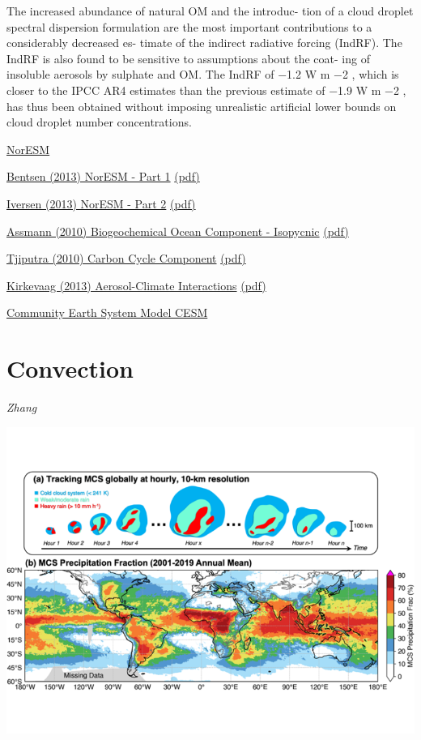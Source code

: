 \documentclass[
]{book}
\begin{document}
The increased abundance of natural OM and the introduc-
tion of a cloud droplet spectral dispersion formulation are the
most important contributions to a considerably decreased es-
timate of the indirect radiative forcing (IndRF). The IndRF
is also found to be sensitive to assumptions about the coat-
ing of insoluble aerosols by sulphate and OM. The IndRF of
−1.2 W m −2 , which is closer to the IPCC AR4 estimates than
the previous estimate of −1.9 W m −2 , has thus been obtained
without imposing unrealistic artificial lower bounds on cloud
droplet number concentrations.

\href{https://www.noresm.org/}{NorESM}

\href{https://gmd.copernicus.org/articles/6/687/2013/}{Bentsen (2013) NorESM - Part 1}
\href{pdf/Bentsen_2013_NorESM_1.pdf}{(pdf)}

\href{https://gmd.copernicus.org/articles/6/389/2013/}{Iversen (2013) NorESM - Part 2}
\href{pdf/Iversen_2013_NorESM_2.pdf}{(pdf)}

\href{https://gmd.copernicus.org/articles/3/143/2010/}{Assmann (2010) Biogeochemical Ocean Component - Isopycnic}
\href{pdf/Assmann_2010_Isopycnic_Ocean_Carbon_Cycle_Model.pdf}{(pdf)}

\href{https://gmd.copernicus.org/articles/3/123/2010/}{Tjiputra (2010) Carbon Cycle Component}
\href{pdf/Tjiputra_2010_Climate_Cycle_Feedbacks.pdf}{(pdf)}

\href{https://gmd.copernicus.org/articles/6/207/2013/}{Kirkevaag (2013) Aerosol-Climate Interactions}
\href{pdf/Kirkevaag_2013_Aerosol_NorESM.pdf}{(pdf)}

\href{https://www.cesm.ucar.edu/}{Community Earth System Model CESM}

\hypertarget{convection}{%
\chapter{Convection}\label{convection}}

\emph{Zhang}

\includegraphics{fig/mesoscale_convection.png}
\end{document}
